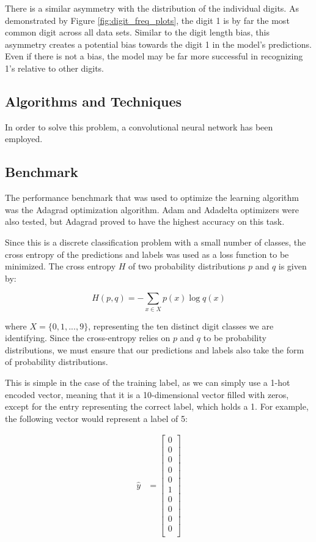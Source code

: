\documentclass[12pt]{article}
\begin{document}
There is a similar asymmetry with the distribution of the individual digits.
As demonstrated by Figure \ref{fig:digit_freq_plots}, the digit 1 is by far the most common digit across all data sets.
Similar to the digit length bias, this asymmetry creates a potential bias towards the digit 1 in the model's predictions.
Even if there is not a bias, the model may be far more successful in recognizing 1's relative to other digits.

\subsection{Algorithms and Techniques}
In order to solve this problem, a convolutional neural network has been employed.


\subsection{Benchmark}
The performance benchmark that was used to optimize the learning algorithm was the Adagrad optimization algorithm. 
Adam and Adadelta optimizers were also tested, but Adagrad proved to have the highest accuracy on this task.

Since this is a discrete classification problem with a small number of classes, the cross entropy of the predictions and labels was used as a loss function to be minimized.
The cross entropy $H$ of two probability distributions $p$ and $q$ is given by:

\begin{equation}
	H(p,q) = -\sum_{x \in X} p(x) \log q(x)
\end{equation}

where $X = \{0, 1, ..., 9 \}$, representing the ten distinct digit classes we are identifying.
Since the cross-entropy relies on $p$ and $q$ to be probability distributions, we must ensure that our predictions and labels also take the form of probability distributions.

This is simple in the case of the training label, as we can simply use a 1-hot encoded vector, meaning that it is a 10-dimensional vector filled with zeros, except for the entry representing the correct label, which holds a 1.
For example, the following vector would represent a label of 5:

\begin{align}
	\hat{y} &= \begin{bmatrix}
		0 \\
		0 \\
		0 \\
		0 \\
		0 \\
		1 \\
		0 \\
		0 \\
		0 \\
		0 \\
	\end{bmatrix} 
\end{align}
\end{document}
